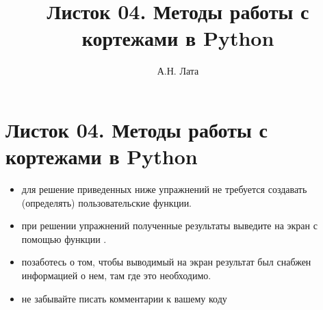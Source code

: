\documentclass[a4,12pt]{article}
\title{Листок 04. Методы работы с кортежами в Python}
\author{А.Н. Лата}
\theoremstyle{remark}
\begin{document}
 


\section*{\centering Листок 04. Методы работы с кортежами в Python}

\begin{exercisenote}[title=Замечания]
\begin{itemize}
    \item для решение приведенных ниже упражнений не требуется создавать (определять) пользовательские функции.
    \item при решении упражнений полученные результаты выведите на экран с помощью функции {\color{blue}{print()}}.
    \item позаботесь о том, чтобы выводимый на экран результат был снабжен информацией о нем, там где это необходимо.
    \item не забывайте писать комментарии к вашему коду
\end{itemize}
\end{exercisenote}
\end{document}
